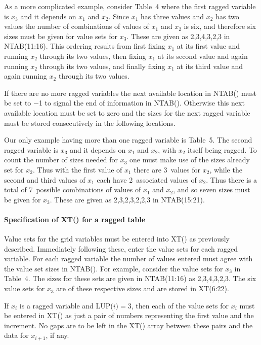\documentclass[twoside]{MATH77}
\begin{document}
As a more complicated example, consider Table~4 where the first ragged
variable is $x_3$ and it depends on $x_1$ and $x_2$. Since $x_1$ has three
values and $x_2$ has two values the number of combinations of values of $x_1$
and $x_2$ is six, and therefore six sizes must be given for value sets for $%
x_3$. These are given as 2,3,4,3,2,3 in NTAB(11:16). This ordering results
from first fixing $x_1$ at its first value and running $x_2$ through its two
values, then fixing $x_1$ at its second value and again running $x_2$
through its two values, and finally fixing $x_1$ at its third value and
again running $x_2$ through its two values.

If there are no more ragged variables the next available location in NTAB()
must be set to $-$1 to signal the end of information in NTAB(). Otherwise this
next available location must be set to zero and the sizes for the next
ragged variable must be stored consecutively in the following locations.

Our only example having more than one ragged variable is Table~5. The second
ragged variable is $x_3$ and it depends on $x_1$ and $x_2$, with $x_2$
itself being ragged. To count the number of sizes needed for $x_3$ one must
make use of the sizes already set for $x_2$. Thus with the first value of $%
x_1$ there are 3~values for $x_2$, while the second and third values of $x_1$
each have 2~associated values of $x_2$. Thus there is a total of 7~possible
combinations of values of $x_1$ and $x_2$, and so seven sizes must be given
for $x_3$. These are given as 2,3,2,3,2,2,3 in NTAB(15:21).

\paragraph{Specification of XT() for a ragged table}

Value sets for the grid variables must be entered into XT() as previously
described. Immediately following these, enter the value sets for each ragged
variable. For each ragged variable the number of values entered must agree
with the value set sizes in NTAB(). For example, consider the value sets for
$x_3$ in Table~4. The sizes for these sets are given in NTAB(11:16) as
2,3,4,3,2,3. The six value sets for $x_3$ are of these respective sizes and
are stored in XT(6:22).

If $x_i$ is a ragged variable and LUP($i) = 3$, then each of the value sets
for $x_i$ must be entered in XT() as just a pair of numbers representing the
first value and the increment. No gaps are to be left in the XT() array
between these pairs and the data for $x_{i+1}$, if any.
\end{document}
